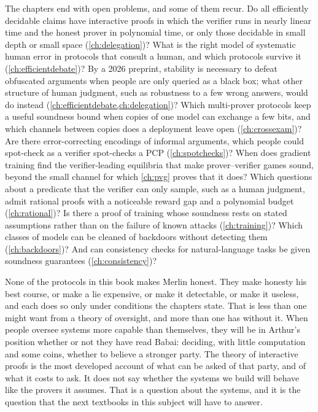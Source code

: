 \begin{refsection}
The chapters end with open problems, and some of them recur. Do all efficiently decidable claims have interactive proofs in which the verifier runs in nearly linear time and the honest prover in polynomial time, or only those decidable in small depth or small space (\cref{ch:delegation})? What is the right model of systematic human error in protocols that consult a human, and which protocols survive it (\cref{ch:efficientdebate})? By a 2026 preprint, stability is necessary to defeat obfuscated arguments when people are only queried as a black box; what other structure of human judgment, such as robustness to a few wrong answers, would do instead (\cref{ch:efficientdebate,ch:delegation})? Which multi-prover protocols keep a useful soundness bound when copies of one model can exchange a few bits, and which channels between copies does a deployment leave open (\cref{ch:crossexam})? Are there error-correcting encodings of informal arguments, which people could spot-check as a verifier spot-checks a PCP (\cref{ch:spotchecks})? When does gradient training find the verifier-leading equilibria that make prover--verifier games sound, beyond the small channel for which \cref{ch:pvg} proves that it does? Which questions about a predicate that the verifier can only sample, such as a human judgment, admit rational proofs with a noticeable reward gap and a polynomial budget (\cref{ch:rational})? Is there a proof of training whose soundness rests on stated assumptions rather than on the failure of known attacks (\cref{ch:training})? Which classes of models can be cleaned of backdoors without detecting them (\cref{ch:backdoors})? And can consistency checks for natural-language tasks be given soundness guarantees (\cref{ch:consistency})?


None of the protocols in this book makes Merlin honest. They make honesty his best course, or make a lie expensive, or make it detectable, or make it useless, and each does so only under conditions the chapters state. That is less than one might want from a theory of oversight, and more than one has without it. When people oversee systems more capable than themselves, they will be in Arthur's position whether or not they have read Babai: deciding, with little computation and some coins, whether to believe a stronger party. The theory of interactive proofs is the most developed account of what can be asked of that party, and of what it costs to ask. It does not say whether the systems we build will behave like the provers it assumes. That is a question about the systems, and it is the question that the next textbooks in this subject will have to answer.


\end{refsection}
